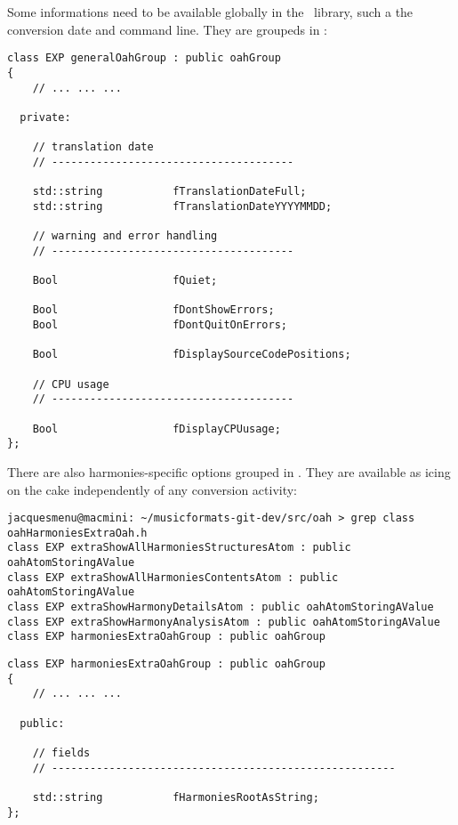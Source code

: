 Some informations need to be available globally in the \mf\ library, such a the conversion date and command line. They are groupeds in :
\begin{lstlisting}[language=CPlusPlus]
class EXP generalOahGroup : public oahGroup
{
	// ... ... ...

  private:

    // translation date
    // --------------------------------------

    std::string           fTranslationDateFull;
    std::string           fTranslationDateYYYYMMDD;

    // warning and error handling
    // --------------------------------------

    Bool                  fQuiet;

    Bool                  fDontShowErrors;
    Bool                  fDontQuitOnErrors;

    Bool                  fDisplaySourceCodePositions;

    // CPU usage
    // --------------------------------------

    Bool                  fDisplayCPUusage;
};
\end{lstlisting}

There are also harmonies-specific options grouped in . They are available as icing on the cake independently of any conversion activity:
\begin{lstlisting}[language=Terminal]
jacquesmenu@macmini: ~/musicformats-git-dev/src/oah > grep class   oahHarmoniesExtraOah.h
class EXP extraShowAllHarmoniesStructuresAtom : public oahAtomStoringAValue
class EXP extraShowAllHarmoniesContentsAtom : public oahAtomStoringAValue
class EXP extraShowHarmonyDetailsAtom : public oahAtomStoringAValue
class EXP extraShowHarmonyAnalysisAtom : public oahAtomStoringAValue
class EXP harmoniesExtraOahGroup : public oahGroup
\end{lstlisting}

\begin{lstlisting}[language=CPlusPlus]
class EXP harmoniesExtraOahGroup : public oahGroup
{
 	// ... ... ...

  public:

    // fields
    // ------------------------------------------------------

    std::string           fHarmoniesRootAsString;
};
\end{lstlisting}


